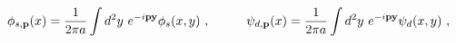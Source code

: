 \begin{equation}\label{1.14}
\phi_{s,{\bf p}}(x)={1 \over 2\pi a}\int d^2y~
e^{-i\bf{py}}\phi_s(x,y)~,\hskip 1cm
\psi_{d,{\bf p}}(x)={1 \over 2\pi a}\int d^2y~
e^{-i\bf{py}}\psi_d(x,y)~,
\end{equation}

